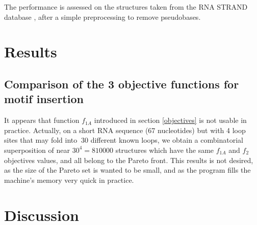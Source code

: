 \documentclass{article}
\begin{document}
The performance is assessed on the structures taken from the RNA STRAND database \cite{andronescu2008rna}, after a simple preprocessing to remove pseudobases.

\section{Results \label{results}}
\subsection{Comparison of the 3 objective functions for motif insertion}
It appears that function $f_{1A}$ introduced in section \ref{objectives} is not usable in practice.
Actually, on a short RNA sequence (67 nucleotides) but with 4 loop sites that may fold into $~30$ different known loops, 
we obtain a combinatorial superposition of near $30^4 = 810 000$ structures which have the same $f_{1A}$ and $f_2$ objectives values, and 
all belong to the Pareto front. This results is not desired, as the size of the Pareto set is wanted to be small, and as the program fills the machine's memory very quick in practice.

\section{Discussion \label{discussion}}




\end{document}
